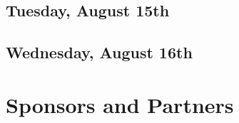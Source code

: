 \documentclass[openany, parskip=full, 12pt, a4]{scrbook}
\begin{document}






\section{Tuesday, August 15th}













\section{Wednesday, August 16th}










 
% 
 

% 

\chapter{Sponsors and Partners}



\newpage


\pagecolor{myblue}
\thispagestyle{empty}
\mbox{}
\end{document}
